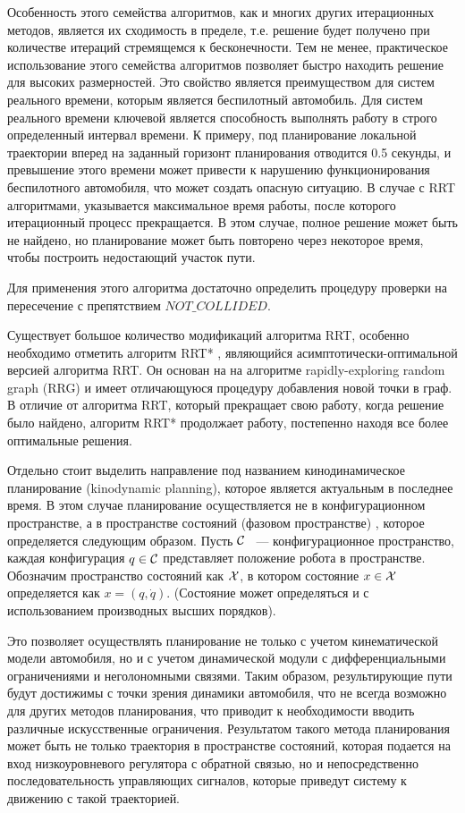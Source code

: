 Особенность этого семейства алгоритмов, как и многих других итерационных методов, является их сходимость
в пределе, т.е. решение будет получено при количестве
итераций стремящемся к бесконечности. Тем не менее, практическое использование этого семейства алгоритмов
позволяет быстро находить решение для высоких размерностей. Это свойство является преимуществом для систем
реального времени, которым является беспилотный автомобиль. Для систем реального времени ключевой является
способность выполнять работу в строго определенный интервал времени. К примеру, под планирование локальной
траектории вперед на заданный горизонт планирования отводится 0.5 секунды, и превышение этого времени может
привести к нарушению функционирования беспилотного автомобиля, что может создать опасную ситуацию.  В случае
с RRT алгоритмами, указывается максимальное время работы, после которого итерационный процесс прекращается.
В этом случае, полное решение может быть не найдено, но планирование может быть повторено через некоторое
время, чтобы построить недостающий участок пути.

Для применения этого алгоритма достаточно определить процедуру проверки на пересечение с препятствием
$NOT\_COLLIDED$.

Существует большое количество модификаций алгоритма RRT, особенно необходимо отметить алгоритм RRT*
\cite{motion_planning_rrt_star}, являющийся асимптотически-оптимальной версией алгоритма RRT. Он основан на
на алгоритме rapidly-exploring random graph (RRG) и имеет отличающуюся процедуру добавления новой точки в граф.
В отличие от алгоритма RRT, который прекращает свою работу, когда решение было найдено, алгоритм RRT* продолжает
работу, постепенно находя все более оптимальные решения.

Отдельно стоит выделить направление под названием кинодинамическое планирование (kinodynamic planning), которое
является актуальным в последнее время. В этом случае планирование осуществляется не в конфигурационном пространстве,
а в пространстве состояний (фазовом пространстве) \cite{motion_planning_kinodynamic_rrt}, которое определяется
следующим образом. Пусть $\mathcal{C}$ ~--- конфигурационное пространство, каждая конфигурация $q \in \mathcal{C}$ представляет
положение робота в пространстве. Обозначим пространство состояний как $\mathcal{X}$, в котором состояние $x \in \mathcal{X}$
определяется как $x = (q, \dot{q})$. (Состояние может определяться и с использованием производных высших порядков).

Это позволяет осуществлять планирование не только с учетом кинематической модели автомобиля, но и с учетом
динамической модули с дифференциальными ограничениями и неголономными связями.
Таким образом, результирующие пути будут достижимы с точки зрения динамики автомобиля, что
не всегда возможно для других методов планирования, что приводит к необходимости вводить различные искусственные
ограничения. Результатом такого метода планирования может быть не только траектория в пространстве
состояний, которая подается на вход низкоуровневого регулятора с обратной связью, но и непосредственно
последовательность управляющих сигналов, которые приведут систему к движению с такой траекторией.

